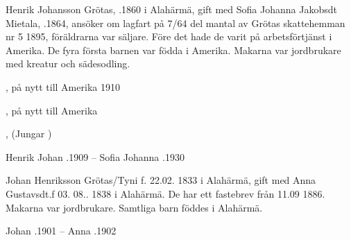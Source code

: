 Henrik Johansson Grötas, .1860  i Alahärmä, gift med Sofia Johanna Jakobsdt Mietala, .1864, ansöker om lagfart på 7/64 del mantal av Grötas skattehemman nr 5  1895, föräldrarna var säljare. Före det hade de varit på arbetsförtjänst i Amerika. De fyra första barnen var födda i Amerika. Makarna var jordbrukare med kreatur och sädesodling.
\begin{jhchildren}
  \item {}, på nytt till Amerika 1910
  \item {}, på nytt till Amerika
  \item {}
  \item {}
  \item {}
  \item {}
  \item {}
  \item {}, (Jungar     )
\end{jhchildren}
Henrik Johan .1909  --  Sofia Johanna .1930


Johan Henriksson  Grötas/Tyni f. 22.02. 1833 i Alahärmä, gift med Anna Gustavsdt.f 03. 08.. 1838 i Alahärmä. De har ett fastebrev från 11.09 1886.  Makarna var jordbrukare. Samtliga barn föddes i Alahärmä.
\begin{jhchildren}
  \item {}
  \item {}
  \item {}
  \item {}
  \item {}
  \item {}
  \item {}
  \item {}
\end{jhchildren}
Johan .1901  --  Anna .1902



